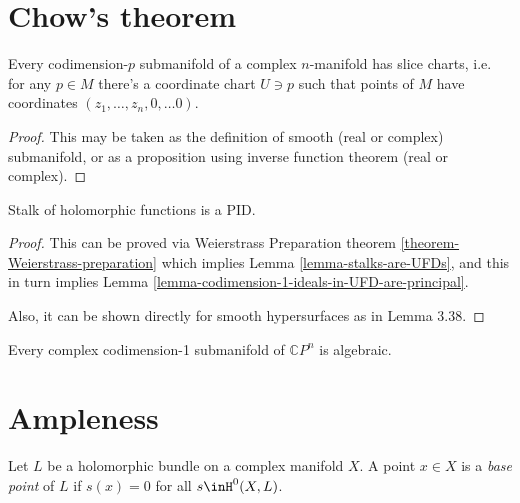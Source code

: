 \section{Chow's theorem}
\label{section-chow-theorem}

\begin{proposition}
\label{proposition-slice-charts}
Every codimension-$p$ submanifold of a complex $n$-manifold has slice charts,
i.e. for any $p \in M$ there's a coordinate chart $U \ni p$ such that points of
$M$ have coordinates $(z_1,\ldots,z_n,0,\ldots 0)$.
\end{proposition}

\begin{proof}
This may be taken as the definition of smooth (real or complex) submanifold, or
as a proposition using inverse function theorem (real or complex).
\end{proof}

\begin{proposition}
\label{proposition-stalk-is-PID}
Stalk of holomorphic functions is a PID.
\end{proposition}

\begin{proof}
This can be proved via Weierstrass Preparation theorem
\ref{theorem-Weierstrass-preparation} which implies
 Lemma \ref{lemma-stalks-are-UFDs}, and this in turn implies Lemma 
\ref{lemma-codimension-1-ideals-in-UFD-are-principal}.

Also, it can be shown directly for smooth hypersurfaces
 as in \cite{lec} Lemma 3.38.
\end{proof}

\begin{theorem}
\label{theorem-Chow-for-hypersurfaces}
Every complex codimension-1 submanifold of $\mathbb{C}P^{n}$ is algebraic.
\end{theorem}

\section{Ampleness}
\label{section-ampleness}

\begin{definition}
\label{definition-base-point}
\begin{reference}
\cite[Definition 2.3.25]{huc}
\end{reference}
Let $L$ be a holomorphic bundle on a complex manifold $X$. A point $x \in X$ is
a {\it base point} of $L$ if $s(x)=0$ for all $s\inH^{0}(X,L)$. 
\end{definition}

